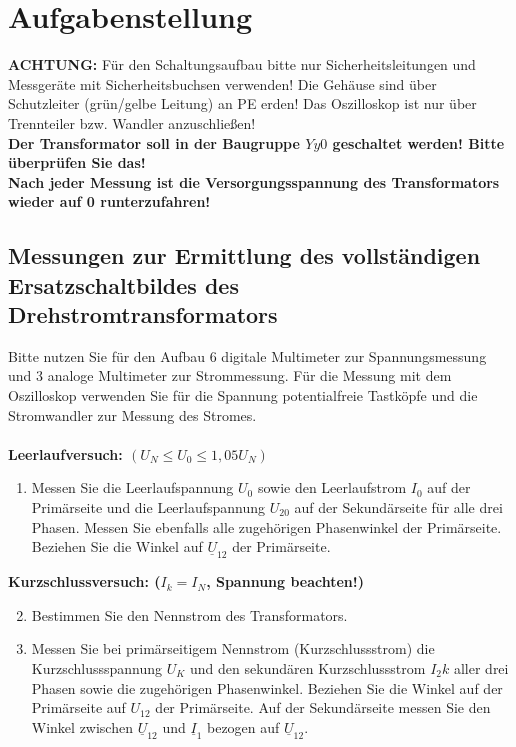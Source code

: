 \section{Aufgabenstellung }
\textbf{ACHTUNG:} Für den Schaltungsaufbau bitte nur Sicherheitsleitungen und Messgeräte mit Sicherheitsbuchsen verwenden! Die Gehäuse sind über Schutzleiter (grün/gelbe Leitung) an PE erden! Das Oszilloskop ist nur über Trennteiler bzw. Wandler anzuschließen! \\
\textbf{Der Transformator soll in der Baugruppe $Yy0$ geschaltet werden! Bitte überprüfen Sie das! \\
Nach jeder Messung ist die Versorgungsspannung des Transformators wieder auf 0 runterzufahren!}
\subsection{Messungen zur Ermittlung des vollständigen Ersatzschaltbildes des Drehstromtransformators}
Bitte nutzen Sie für den Aufbau 6 digitale Multimeter zur Spannungsmessung und 3 analoge Multimeter zur Strommessung. Für die Messung mit dem Oszilloskop verwenden Sie für die Spannung potentialfreie Tastköpfe und die Stromwandler zur Messung des Stromes. \\\ \\
\textbf{Leerlaufversuch: $(U_N \leq U_0 \leq 1,05 U_N)$}
\begin{enumerate}[label=\alph*)]
  \item Messen Sie die Leerlaufspannung $U_0$ sowie den Leerlaufstrom $I_0$ auf der Primärseite und die Leerlaufspannung $U_{20}$ auf der Sekundärseite für alle drei Phasen. Messen Sie ebenfalls alle zugehörigen Phasenwinkel der Primärseite. Beziehen Sie die Winkel auf $\underline U_{12}$ der Primärseite.
\end{enumerate}
\textbf{Kurzschlussversuch: ($I_k = I_N$, Spannung beachten!)}
\begin{enumerate}[label=\alph*)]
  \setcounter{enumi}{1}
  \item Bestimmen Sie den Nennstrom des Transformators. 
  \item Messen Sie bei primärseitigem Nennstrom (Kurzschlussstrom) die Kurzschlussspannung $U_K$ und den sekundären Kurzschlussstrom $I_2k$ aller drei Phasen sowie die zugehörigen Phasenwinkel. Beziehen Sie die Winkel auf der Primärseite auf $U_{12}$ der Primärseite. Auf der Sekundärseite messen Sie den Winkel zwischen $\underline U_{12}$ und $\underline I_1$ bezogen auf $\underline U_{12}$.  
\end{enumerate}

